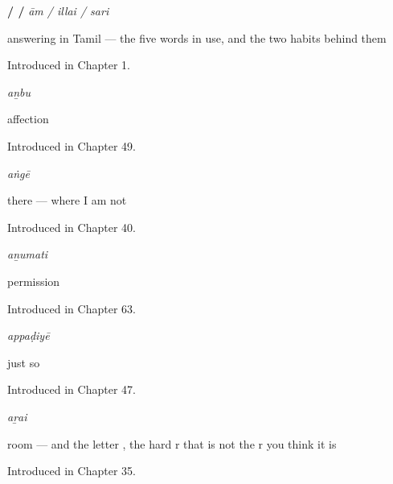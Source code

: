 \noindent\begin{minipage}[t]{\linewidth}
\raggedright
\textbf{ /  / }\enspace\emph{ām / illai / sari}\par
\small answering in Tamil — the five words in use, and the two habits behind them\par
\footnotesize Introduced in Chapter 1.
\end{minipage}\par\medskip

\noindent\begin{minipage}[t]{\linewidth}
\raggedright
\textbf{}\enspace\emph{aṉbu}\par
\small affection\par
\footnotesize Introduced in Chapter 49.
\end{minipage}\par\medskip

\noindent\begin{minipage}[t]{\linewidth}
\raggedright
\textbf{}\enspace\emph{aṅgē}\par
\small there — where I am not\par
\footnotesize Introduced in Chapter 40.
\end{minipage}\par\medskip

\noindent\begin{minipage}[t]{\linewidth}
\raggedright
\textbf{}\enspace\emph{aṉumati}\par
\small permission\par
\footnotesize Introduced in Chapter 63.
\end{minipage}\par\medskip

\noindent\begin{minipage}[t]{\linewidth}
\raggedright
\textbf{}\enspace\emph{appaḍiyē}\par
\small just so\par
\footnotesize Introduced in Chapter 47.
\end{minipage}\par\medskip

\noindent\begin{minipage}[t]{\linewidth}
\raggedright
\textbf{}\enspace\emph{aṟai}\par
\small room — and the letter , the hard r that is not the r you think it is\par
\footnotesize Introduced in Chapter 35.
\end{minipage}\par\medskip

